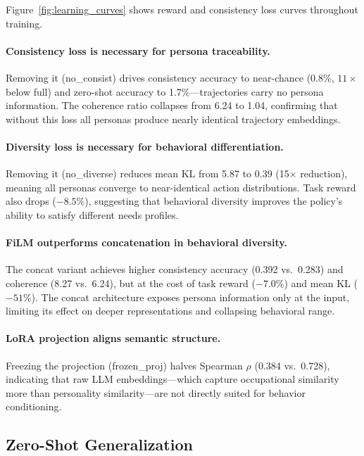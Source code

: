 \documentclass{article}
\begin{document}
Figure~\ref{fig:learning_curves} shows reward and consistency loss curves
throughout training.

\paragraph{Consistency loss is necessary for persona traceability.}
Removing it (no\_consist) drives consistency accuracy to near-chance (0.8\%,
$11\times$ below full) and zero-shot accuracy to 1.7\%---trajectories carry
no persona information.
The coherence ratio collapses from 6.24 to 1.04, confirming that without this
loss all personas produce nearly identical trajectory embeddings.

\paragraph{Diversity loss is necessary for behavioral differentiation.}
Removing it (no\_diverse) reduces mean KL from 5.87 to 0.39 (15$\times$
reduction), meaning all personas converge to near-identical action
distributions.
Task reward also drops ($-8.5\%$), suggesting that behavioral diversity
improves the policy's ability to satisfy different needs profiles.

\paragraph{FiLM outperforms concatenation in behavioral diversity.}
The concat variant achieves higher consistency accuracy (0.392 vs.\ 0.283)
and coherence (8.27 vs.\ 6.24), but at the cost of task reward
($-7.0\%$) and mean KL ($-51\%$).
The concat architecture exposes persona information only at the input,
limiting its effect on deeper representations and collapsing behavioral range.

\paragraph{LoRA projection aligns semantic structure.}
Freezing the projection (frozen\_proj) halves Spearman $\rho$
(0.384 vs.\ 0.728), indicating that raw LLM embeddings---which capture
occupational similarity more than personality similarity---are not directly
suited for behavior conditioning.

\subsection{Zero-Shot Generalization}
\label{sec:zeroshot}
\end{document}
